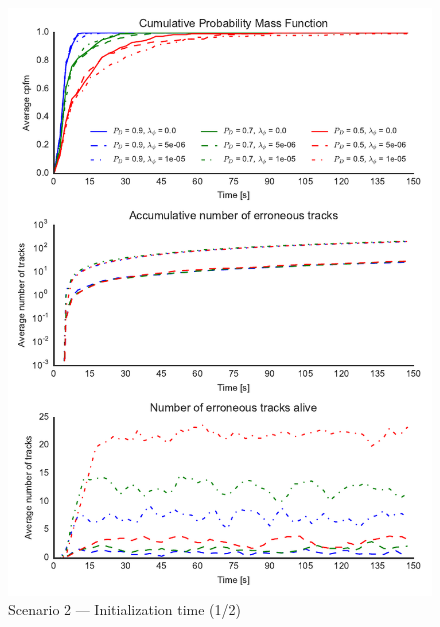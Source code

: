 \begin{figure}
\centering
\includegraphics{Figures/plots/Scenario2_Init-Time(1-2).pdf}
\caption{Scenario 2 --- Initialization time (1/2)}\label{fig:init2_time_1-2}
\end{figure}

